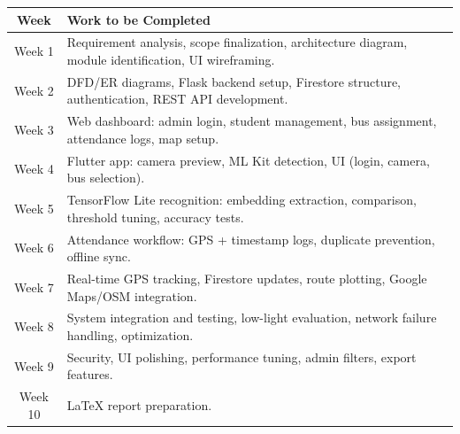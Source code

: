 \documentclass[11pt,a4paper]{article}
\begin{document}
{\small
\begin{longtable}{|c|p{10cm}|}
\hline
\textbf{Week} & \textbf{Work to be Completed} \\ \hline

Week 1 & Requirement analysis, scope finalization, architecture diagram, module identification, UI wireframing. \\ \hline

Week 2 & DFD/ER diagrams, Flask backend setup, Firestore structure, authentication, REST API development. \\ \hline

Week 3 & Web dashboard: admin login, student management, bus assignment, attendance logs, map setup. \\ \hline

Week 4 & Flutter app: camera preview, ML Kit detection, UI (login, camera, bus selection). \\ \hline

Week 5 & TensorFlow Lite recognition: embedding extraction, comparison, threshold tuning, accuracy tests. \\ \hline

Week 6 & Attendance workflow: GPS + timestamp logs, duplicate prevention, offline sync. \\ \hline

Week 7 & Real-time GPS tracking, Firestore updates, route plotting, Google Maps/OSM integration. \\ \hline

Week 8 & System integration and testing, low-light evaluation, network failure handling, optimization. \\ \hline

Week 9 & Security, UI polishing, performance tuning, admin filters, export features. \\ \hline

Week 10 & LaTeX report preparation. \\ \hline
\end{longtable}
}
\end{document}
